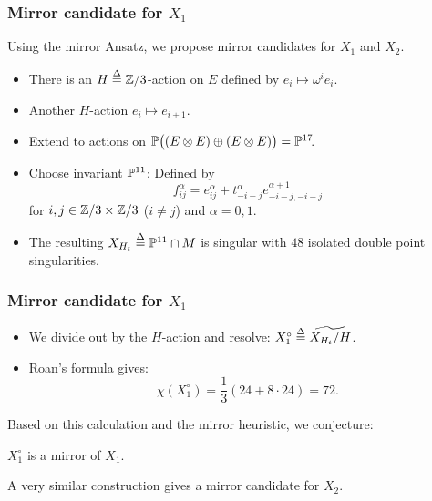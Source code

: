 \begin{frame}
\frametitle{Mirror candidate for $X_1$}

Using the mirror Ansatz, we propose mirror candidates for $X_1$ and $X_2$.

\begin{itemize}[<+->]
	\item
	There is an $H \defeq \Z/3$-action on $E$ defined by $e_i \mapsto \omega^i e_i$.

	\item
	Another $H$-action $e_i \mapsto e_{i + 1}$.

	\item
	Extend to actions on $\P\big((E \otimes E) \oplus (E \otimes E)\big) = \P^{17}\mkern-4mu$.

	\item
	Choose invariant $\P^{11}$: Defined by
	\[
	    f_{ij}^\alpha = e_{ij}^\alpha + t_{-i-j}^\alpha e_{-i-j,-i-j}^{\alpha+1}
	\]
	for $i,j \in \Z/3 \times \Z/3$ ($i \neq j$) and $\alpha = 0,1$.

	\item
	The resulting $X_{H_t} \defeq \P^{11} \cap M$ is singular with $48$ isolated double point singularities.
\end{itemize}

\end{frame}

\begin{frame}
\frametitle{Mirror candidate for $X_1$}

\begin{itemize}
	\item We divide out by the $H$-action and resolve: $X_1^\circ \defeq \widetilde{X_{H_t}/H}$.
	\pause
	\item Roan's formula gives:
	\[
	    \chi(X_1^\circ) = \frac{1}{3} \left(24 + 8 \cdot 24\right) = 72.
	\]
\end{itemize}

Based on this calculation and the mirror heuristic, we conjecture:

\begin{conjecture}
    $X_1^\circ$ is a mirror of $X_1$.
\end{conjecture}

\pause
\begin{remark}
    A very similar construction gives a mirror candidate for $X_2$.
\end{remark}

\end{frame}
